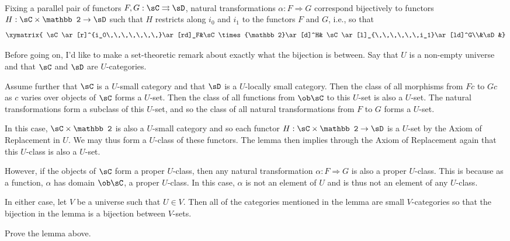\documentclass[main.tex]{subfiles}
\begin{document}
\paragraph{}
\begin{lemma}
	Fixing a parallel pair of functors $F,G:\sC\rightrightarrows\sD$, natural
	transformations $\alpha:F\Rightarrow G$ correspond bijectively to functors
	$H:\sC\times{\mathbb 2}\rightarrow\sD$ such that $H$ restricts along $i_0$
	and $i_1$ to the functors $F$ and $G$, i.e., so that
	\[\xymatrix{
			\sC\ar[r]^{i_0\,\,\,\,\,\,\,}\ar[rd]_F&\sC\times{\mathbb 2}\ar[d]^H&
	\sC\ar[l]_{\,\,\,\,\,\,i_1}\ar[ld]^G\\&\sD&}\]
\end{lemma}
\popthm

Before going on, I'd like to make a set-theoretic remark about exactly what the
bijection is between. Say that $U$ is a non-empty universe and that $\sC$ and
$\sD$ are $U$-categories.

Assume further that $\sC$ is a $U$-small category and that $\sD$ is a
$U$-locally small category. Then the class of all morphisms from $Fc$ to $Gc$ as
$c$ varies over objects of $\sC$ forms a $U$-set. Then the class of all
functions from $\ob\sC$ to this $U$-set is also a $U$-set. The natural
transformations form a subclass of this $U$-set, and so the class of all natural
transformations from $F$ to $G$ forms a $U$-set.

In this case, $\sC\times{\mathbb 2}$ is also a $U$-small category and so each
functor $H:\sC\times{\mathbb 2}\rightarrow\sD$ is a $U$-set by the Axiom of
Replacement in $U$. We may thus form a $U$-class of these functors. The lemma
then implies through the Axiom of Replacement again that this $U$-class is also
a $U$-set.

However, if the objects of $\sC$ form a proper $U$-class, then any natural
transformation $\alpha:F\Rightarrow G$ is also a proper $U$-class. This is
because as a function, $\alpha$ has domain $\ob\sC$, a proper $U$-class. In this
case, $\alpha$ is not an element of $U$ and is thus not an element of any
$U$-class.

In either case, let $V$ be a universe such that $U\in V$. Then all of the
categories mentioned in the lemma are small $V$-categories so that the bijection
in the lemma is a bijection between $V$-sets.

\begin{exercise}
	Prove the lemma above.
\end{exercise}
\end{document}

